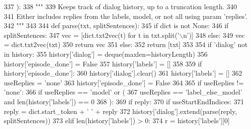 \begin{DoxyCode}
337 ):
338     \textcolor{stringliteral}{"""}
339 \textcolor{stringliteral}{    Keeps track of dialog history, up to a truncation length.}
340 \textcolor{stringliteral}{}
341 \textcolor{stringliteral}{    Either includes replies from the labels, model, or not all using param 'replies'.}
342 \textcolor{stringliteral}{    """}
343 
344     \textcolor{keyword}{def }parse(txt, splitSentences):
345         \textcolor{keywordflow}{if} dict \textcolor{keywordflow}{is} \textcolor{keywordflow}{not} \textcolor{keywordtype}{None}:
346             \textcolor{keywordflow}{if} splitSentences:
347                 vec = [dict.txt2vec(t) \textcolor{keywordflow}{for} t \textcolor{keywordflow}{in} txt.split(\textcolor{stringliteral}{'\(\backslash\)n'})]
348             \textcolor{keywordflow}{else}:
349                 vec = dict.txt2vec(txt)
350             \textcolor{keywordflow}{return} vec
351         \textcolor{keywordflow}{else}:
352             \textcolor{keywordflow}{return} [txt]
353 
354     \textcolor{keywordflow}{if} \textcolor{stringliteral}{'dialog'} \textcolor{keywordflow}{not} \textcolor{keywordflow}{in} history:
355         history[\textcolor{stringliteral}{'dialog'}] = deque(maxlen=historyLength)
356         history[\textcolor{stringliteral}{'episode\_done'}] = \textcolor{keyword}{False}
357         history[\textcolor{stringliteral}{'labels'}] = []
358 
359     \textcolor{keywordflow}{if} history[\textcolor{stringliteral}{'episode\_done'}]:
360         history[\textcolor{stringliteral}{'dialog'}].clear()
361         history[\textcolor{stringliteral}{'labels'}] = []
362         useReplies = \textcolor{stringliteral}{'none'}
363         history[\textcolor{stringliteral}{'episode\_done'}] = \textcolor{keyword}{False}
364 
365     \textcolor{keywordflow}{if} useReplies != \textcolor{stringliteral}{'none'}:
366         \textcolor{keywordflow}{if} useReplies == \textcolor{stringliteral}{'model'} \textcolor{keywordflow}{or} (
367             useReplies == \textcolor{stringliteral}{'label\_else\_model'} \textcolor{keywordflow}{and} len(history[\textcolor{stringliteral}{'labels'}]) == 0
368         ):
369             \textcolor{keywordflow}{if} reply:
370                 \textcolor{keywordflow}{if} useStartEndIndices:
371                     reply = dict.start\_token + \textcolor{stringliteral}{' '} + reply
372                 history[\textcolor{stringliteral}{'dialog'}].extend(parse(reply, splitSentences))
373         \textcolor{keywordflow}{elif} len(history[\textcolor{stringliteral}{'labels'}]) > 0:
374             r = history[\textcolor{stringliteral}{'labels'}][0]

\end{DoxyCode}
